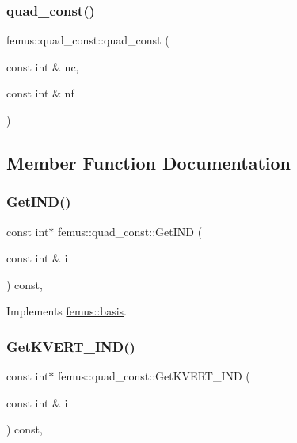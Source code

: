 \subsubsection{\texorpdfstring{quad\+\_\+const()}{quad\_const()}}
{\footnotesize\ttfamily femus\+::quad\+\_\+const\+::quad\+\_\+const (\begin{DoxyParamCaption}\item[{const int \&}]{nc,  }\item[{const int \&}]{nf }\end{DoxyParamCaption})\hspace{0.3cm}{\ttfamily [inline]}}



\subsection{Member Function Documentation}
\mbox{\label{classfemus_1_1quad__const_a44c52292981696a6f8b36a0b3de5598b}} 
\subsubsection{\texorpdfstring{Get\+I\+N\+D()}{GetIND()}}
{\footnotesize\ttfamily const int$\ast$ femus\+::quad\+\_\+const\+::\+Get\+I\+ND (\begin{DoxyParamCaption}\item[{const int \&}]{i }\end{DoxyParamCaption}) const\hspace{0.3cm}{\ttfamily [inline]}, {\ttfamily [virtual]}}



Implements \mbox{\hyperlink{classfemus_1_1basis_a3f63ad97ce70cd4a1196ede69f1f144b}{femus\+::basis}}.

\mbox{\label{classfemus_1_1quad__const_a1254abf3bc41679deaa514fcd63138a0}} 
\subsubsection{\texorpdfstring{Get\+K\+V\+E\+R\+T\+\_\+\+I\+N\+D()}{GetKVERT\_IND()}}
{\footnotesize\ttfamily const int$\ast$ femus\+::quad\+\_\+const\+::\+Get\+K\+V\+E\+R\+T\+\_\+\+I\+ND (\begin{DoxyParamCaption}\item[{const int \&}]{i }\end{DoxyParamCaption}) const\hspace{0.3cm}{\ttfamily [inline]}, {\ttfamily [virtual]}}



